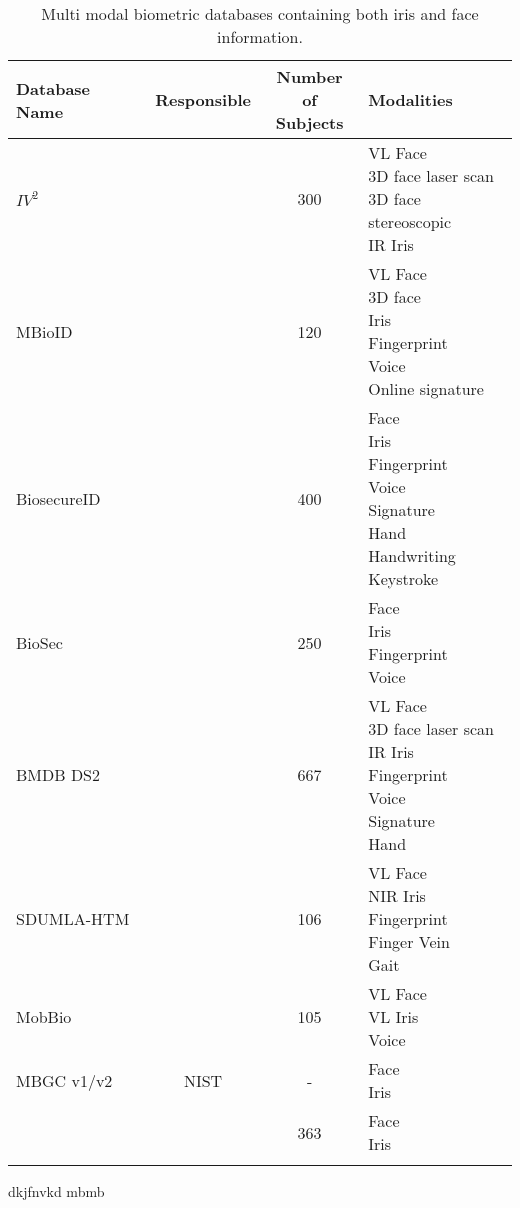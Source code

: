 \begin{table}[H]
\centering
\begin{tabularx}{\textwidth}{ |X|c|c|X| }
\hline
\rowcolor{Grey}
\textbf{Database Name}&\textbf{Responsible}&\makecell{\textbf{Number of} \\ \textbf{Subjects}}&\textbf{Modalities}\\
\hline
$IV^2$&\cite{Petrovska-Delacretaz2008a}&300&\makecell{VL Face\\3D face laser scan\\ 3D face stereoscopic\\IR Iris}\\
\hline
\rowcolor{lightGrey}
MBioID&\cite{Dessimoz2007}&120&\makecell{VL Face\\3D face \\ Iris\\Fingerprint\\Voice\\ Online signature}\\
\hline
BiosecureID&\cite{BiosecID2008}&400&\makecell{Face\\Iris\\Fingerprint\\Voice\\Signature\\Hand\\Handwriting\\Keystroke}\\
\hline
\rowcolor{lightGrey}
BioSec&\cite{Biosec2007}&250&\makecell{Face\\ Iris\\Fingerprint\\Voice}\\
\hline
BMDB DS2&\cite{Ortega-Garcia2010}&667&\makecell{VL Face\\3D face laser scan\\ IR Iris\\Fingerprint\\Voice\\Signature\\Hand }\\
\hline
\rowcolor{lightGrey}
SDUMLA-HTM&\cite{Yin2011}&106&\makecell{VL Face  \\ NIR Iris \\ Fingerprint \\ Finger Vein\\Gait\\} \\
\hline
MobBio&\cite{Sequeira2014}&105& \makecell{VL Face \\ VL Iris \\ Voice} \\
\hline
\rowcolor{lightGrey}
MBGC v1/v2&NIST&-&\makecell{Face\\Iris}\\
\hline
&\cite{Bowyer2016b}&363&\makecell{Face\\Iris}\\
\hline
\rowcolor{lightGrey}
&&&\\
\hline
\end{tabularx}
\label{MultiDatabase}
\caption{Multi modal biometric databases containing both iris and face information.}
\end{table}

dkjfnvkd  mbmb














